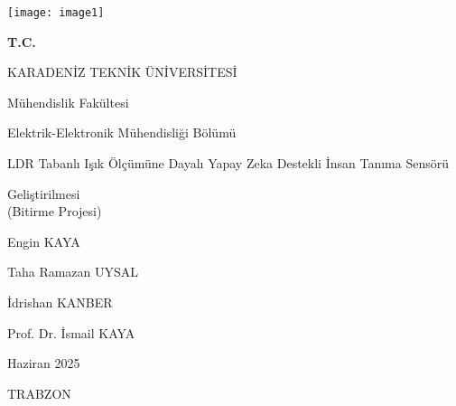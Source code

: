 \begin{center}
\texttt{[image: image1]}

{\fontsize{16}{16}\selectfont

\textbf{T.C.}

KARADENİZ TEKNİK ÜNİVERSİTESİ

Mühendislik Fakültesi

}

\vspace{1.75\baselineskip}

{\fontsize{14}{14}\selectfont Elektrik-Elektronik Mühendisliği Bölümü}

\vspace{5\baselineskip}


{\fontsize{26}{26}\selectfont %
LDR Tabanlı Işık Ölçümüne Dayalı Yapay Zeka Destekli İnsan Tanıma Sensörü}


\vspace{0.3em}


{\fontsize{26}{26}\selectfont Geliştirilmesi}
\\
{\fontsize{14}{14}\selectfont (Bitirme Projesi)}


\vspace{4\baselineskip}

{\fontsize{14}{14} Engin KAYA}

{\fontsize{14}{14} Taha Ramazan UYSAL}

{\fontsize{14}{14} İdrishan KANBER}


\vspace{5\baselineskip}

{\fontsize{14}{14}\selectfont Prof. Dr. İsmail KAYA}

\vspace{5\baselineskip}

{\fontsize{14}{14}\selectfont Haziran 2025}

\vspace{0.25em}

{\fontsize{14}{14}\selectfont TRABZON}

\end{center}